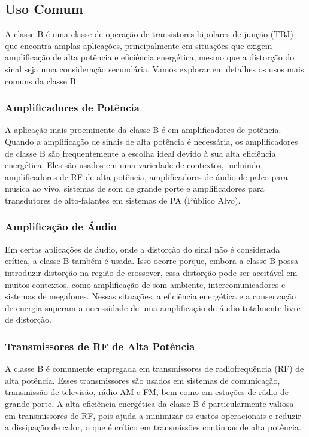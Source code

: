 \subsection{Uso Comum}

A classe B é uma classe de operação de transistores bipolares de junção (TBJ) que encontra amplas aplicações, principalmente em situações que exigem amplificação de alta potência e eficiência energética, mesmo que a distorção do sinal seja uma consideração secundária. Vamos explorar em detalhes os usos mais comuns da classe B.

\subsubsection{Amplificadores de Potência}

A aplicação mais proeminente da classe B é em amplificadores de potência. Quando a amplificação de sinais de alta potência é necessária, os amplificadores de classe B são frequentemente a escolha ideal devido à sua alta eficiência energética. Eles são usados em uma variedade de contextos, incluindo amplificadores de RF de alta potência, amplificadores de áudio de palco para música ao vivo, sistemas de som de grande porte e amplificadores para transdutores de alto-falantes em sistemas de PA (Público Alvo).

\subsubsection{Amplificação de Áudio}

Em certas aplicações de áudio, onde a distorção do sinal não é considerada crítica, a classe B também é usada. Isso ocorre porque, embora a classe B possa introduzir distorção na região de crossover, essa distorção pode ser aceitável em muitos contextos, como amplificação de som ambiente, intercomunicadores e sistemas de megafones. Nessas situações, a eficiência energética e a conservação de energia superam a necessidade de uma amplificação de áudio totalmente livre de distorção.

\subsubsection{Transmissores de RF de Alta Potência}

A classe B é comumente empregada em transmissores de radiofrequência (RF) de alta potência. Esses transmissores são usados em sistemas de comunicação, transmissão de televisão, rádio AM e FM, bem como em estações de rádio de grande porte. A alta eficiência energética da classe B é particularmente valiosa em transmissores de RF, pois ajuda a minimizar os custos operacionais e reduzir a dissipação de calor, o que é crítico em transmissões contínuas de alta potência.

